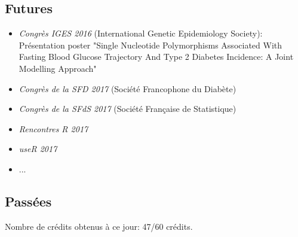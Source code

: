 \documentclass[11pt, a4paper]{article}
\begin{document}
\subsection{Futures}
\par{
\begin{itemize}
    \item \textit{Congrès IGES 2016} (International Genetic Epidemiology Society): Présentation poster "Single Nucleotide Polymorphisms Associated With Fasting Blood Glucose Trajectory And Type 2 Diabetes Incidence: A Joint Modelling Approach"
    \item \textit{Congrès de la SFD 2017} (Société Francophone du Diabète)
    \item \textit{Congrès de la SFdS 2017} (Société Française de Statistique)
    \item \textit{Rencontres R 2017}
    \item \textit{useR 2017}
    \item ...
\end{itemize}
}

\subsection{Passées}
\par{
Nombre de crédits obtenus à ce jour: 47/60 crédits.

}



\clearpage
{}




\end{document}

